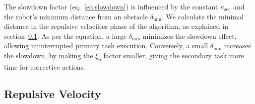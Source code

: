 \documentclass[]{article}
\begin{document}
The slowdown factor (eq.~\ref{eq:slowdown}) is influenced by the constant \( \kappa_{\text{sec}} \) and the robot's minimum distance from an obstacle \( \delta_{\text{min}} \). We calculate the minimal distance in the repulsive velocities phase of the algorithm, as explained in section~\ref{chap:repulsive velocity}. As per the equation, a large \( \delta_{\text{min}} \) minimizes the slowdown effect, allowing uninterrupted primary task execution. Conversely, a small \( \delta_{\text{min}} \) increases the slowdown, by making the $\xi_{p}$ factor smaller, giving the secondary task more time for corrective actions.

\subsection{Repulsive Velocity}
\label{chap:repulsive velocity}
\end{document}
